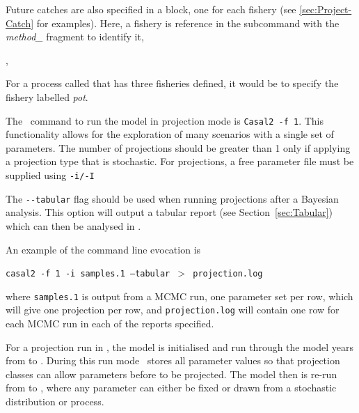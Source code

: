 
Future catches are also specified in a  block, one for each fishery (see \ref{sec:Project-Catch} for examples). Here, a fishery is reference in the  subcommand with the \textit{method\_} fragment to identify it,

,

For a process called  that has three fisheries defined, it would be  to specify the fishery labelled \textit{pot}.

The \CNAME\ command to run the model in projection mode is \texttt{Casal2 -f 1}. This functionality allows for the exploration of many scenarios with a single set of parameters. The number of projections should be greater than 1 only if applying a projection type that is stochastic. For projections, a free parameter file must be supplied using \texttt{-i/-I}

The \texttt{-{}-tabular} flag should be used when running projections after a Bayesian analysis. This option will output a tabular report (see Section~\ref{sec:Tabular}) which can then be analysed in \R.

An example of the command line evocation is

\texttt{casal2 -f 1 -i samples.1 --tabular $>$ projection.log}

where \texttt{samples.1} is output from a MCMC run, one parameter set per row, which will give one projection per row, and \texttt{projection.log} will contain one row for each MCMC run in each of the reports specified.

For a projection run in \CNAME, the model is initialised and run through the model years from  to . During this run mode \CNAME\ stores all parameter values so that projection classes can allow parameters before  to be projected. The model then is re-run from  to , where any parameter can either be fixed or drawn from a stochastic distribution or process.

